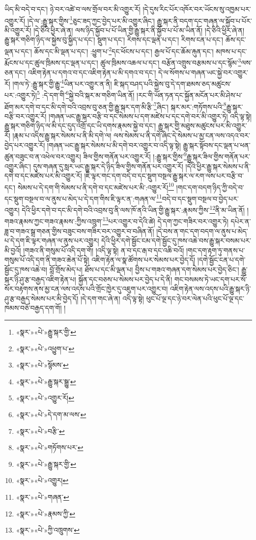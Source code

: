 ཡིད་མི་བདེ་བ་དང་། ཉེ་བར་འཚེ་བ་ལས་གྲོལ་བར་མི་འགྱུར་རོ། །དེ་དུས་རིང་པོར་འཁོར་བར་ཡོངས་སུ་འཁྱམ་པར་འགྱུར་རོ། །དེ་ལ་:རྒྱུ་སྐར་གྱིས་\footnote{«སྣར་»«པེ་»རྒྱུ་སྐར་གྱི་}ཅུང་ཟད་ཀྱང་བྱེད་པར་མི་འགྱུར་ཞིང་། རྒྱུ་སྐར་ནི་བདག་དང་གཞན་ལ་སྐྱོབ་པ་པོར་མི་འགྱུར་རོ། །དེ་ཅིའི་ཕྱིར་ཞེ་ན། ལས་ཉིད་སྐྱོབ་པ་པོ་ཡིན་གྱི་རྒྱུ་སྐར་ནི་སྐྱོབ་པ་པོ་མ་ཡིན་ནོ། །དེ་ཅིའི་ཕྱིར་ཞེ་ན། རྒྱུ་སྐར་གཅིག་ཉིད་ལ་སྐྱེས་བུ་སྐྱིད་པ་དང་། སྡུག་པ་དང་། རིགས་དང་ལྡན་པ་དང་། རིགས་ངན་པ་དང་། ཆོས་དང་ལྡན་པ་དང་། ཆོས་དང་མི་ལྡན་པ་དང་། :ཕྱུག་པ་\footnote{«སྣར་»«པེ་»འཕྱུག་པ་}དང་ཕོངས་པ་དང་། རྒྱལ་པོ་དང་ཆོམ་རྐུན་དང་། མཁས་པ་དང་རྨོངས་པ་དང་ཚུལ་ཁྲིམས་དང་ལྡན་པ་དང་། ཚུལ་ཁྲིམས་འཆལ་པ་དང་། བརྩོན་འགྲུས་བརྩམས་པ་དང་སྙོམ་\footnote{«སྣར་»«པེ་»སྙོམས་}ལས་ཅན་དང་། འཇིག་རྟེན་པ་དགའ་བ་དང་འཇིག་རྟེན་པ་མི་དགའ་བ་དང་། དེ་ལ་སོགས་པ་གཞན་ཡང་སྐྱེ་བར་འགྱུར་རོ། །གལ་ཏེ་:རྒྱུ་སྐར་གྱི་རྒྱུ་\footnote{«སྣར་»«པེ་»རྒྱུ་སྐར་སྒྱུ་}ཡིན་པར་འགྱུར་ན་ནི། ཇི་སྐད་བཤད་པའི་སྐྱེས་བུ་དེ་དག་ཐམས་ཅད་མཚུངས་པར་:འགྱུར་ཏེ།\footnote{«སྣར་»«པེ་»འགྱུར་རོ།} :དེ་དག་གི་\footnote{«སྣར་»«པེ་»དེ་དག་མ་ལས་}སྐྱེ་བའི་སྐར་མ་གཅིག་ཡིན་ནོ། །རང་གི་ཡོན་ཏན་དང་སྐྱོན་མངོན་པར་མི་ཤེས་པ་ཐོག་མར་དགེ་བ་དང་མི་དགེ་བའི་འབྲས་བུ་ཅན་གྱི་རྒྱུ་སྐར་དག་མི་རྩི་\footnote{«སྣར་»«པེ་»བརྩི་}ཞིང་། སྐར་མར་:གཏོགས་པའི་\footnote{«སྣར་»«པེ་»གཏོགས་པར་}རྒྱུ་སྐར་བརྩི་བར་འགྱུར་རོ། །གཞན་ཡང་རྒྱུ་སྐར་བརྩི་བ་དང་སེམས་པ་དག་མཛེས་པ་དང་དགེ་བར་མི་འགྱུར་ཏེ། འདི་ལྟ་སྟེ། རྒྱུ་སྐར་གཅིག་ཉིད་ལ་མི་དང་དུད་འགྲོ་དང་ཡི་དགས་རྣམས་སྐྱེ་བ་དང་། རྒྱུ་སྐར་གྱི་མཐུས་མཚུངས་པར་མི་འགྱུར་རོ། །རྣམ་པ་འདིས་རྒྱུ་སྐར་སེམས་པ་ནི་མི་དགེ་ལ། ལས་སེམས་པ་ནི་དགེ་ཞིང་དེ་སེམས་པ་མྱ་ངན་ལས་འདའ་བར་བྱེད་པར་འགྱུར་རོ། །གཞན་ཡང་རྒྱུ་སྐར་སེམས་པ་མི་དགེ་བར་འགྱུར་བ་འདི་ལྟ་སྟེ། རྒྱུ་སྐར་སྟོབས་དང་ལྡན་པ་ཕན་ཚུན་བཟུང་བ་ན་འཕེལ་བར་འགྱུར། ཟིལ་གྱིས་གནོན་པར་འགྱུར་རོ། །:རྒྱུ་སྐར་གྱིས་\footnote{«སྣར་»«པེ་»རྒྱུ་སྐར་གྱི་}རྒྱུ་སྐར་ཟིལ་གྱིས་གནོན་པར་འགྱུར་ཞིང་། དུས་གཞན་དུ་སླར་ཡང་རྒྱུ་སྐར་དེ་ཉིད་ཟིལ་གྱིས་གནོན་པར་འགྱུར་རོ། །དེའི་ཕྱིར་རྒྱུ་སྐར་སེམས་པ་ནི་དགེ་བ་དང་མཛེས་པར་མི་འགྱུར་རོ། །ཇི་ལྟར་གང་དག་བདེ་བ་དང་སྡུག་བསྔལ་རྒྱུ་སྐར་ལ་རག་ལས་པར་བརྩི་བ་དང་། སེམས་པ་དེ་དག་གི་སེམས་པ་ནི་དགེ་བ་དང་མཛེས་པར་མི་:འགྱུར་རོ།\footnote{«སྣར་»«པེ་»འགྱུར།} །གང་དག་བདག་ཉིད་ཀྱི་བདེ་བ་དང་སྡུག་བསྔལ་བ་ལ་ནུས་པ་མེད་པ་དེ་དག་གིས་ཇི་ལྟར་ན་:གཞན་ལ་\footnote{«སྣར་»«པེ་»གཞན་}བདེ་བ་དང་སྡུག་བསྔལ་བ་བྱེད་པར་འགྱུར། དེའི་ཕྱིར་དགེ་བ་དང་མི་དགེ་བའི་འབྲས་བུ་ནི་ལས་ཁོ་ནའི་ཡིན་གྱི་རྒྱུ་སྐར་:རྣམས་ཀྱིས་\footnote{«སྣར་»«པེ་»རྣམས་ཀྱི་}ནི་མ་ཡིན་ནོ། །གཟའ་རྣམས་ཀྱང་གཟའ་རྣམས་:ཀྱིས་འཁྲུག་\footnote{«སྣར་»«པེ་»ཀྱི་འཁྲུགས་}པར་འགྱུར་བ་དེའི་ཚེ། དེ་དག་ཀྱང་གཟིར་བར་འགྱུར་ཏེ། དཔེར་ན་ཟླ་བ་གཟའ་སྒྲ་གཅན་གྱིས་བཟུང་བས་གཟིར་བར་འགྱུར་བ་བཞིན་ནོ། །དེ་བས་ན་གང་དག་བདག་ལ་ནུས་པ་མེད་པ་དེ་དག་ཇི་ལྟར་གཞན་ལ་ནུས་པར་འགྱུར། དེའི་ཕྱིར་དགེ་སྦྱོང་ངམ་དགེ་སྦྱོང་དུ་ཁས་འཆེ་བས་རྒྱུ་སྐར་བསམ་པར་མི་བྱའོ། །གཟའ་ནི་གསུམ་པོ་འདི་དག་གོ། །འདི་ལྟ་སྟེ། ན་བ་དང་རྒ་བ་དང་འཆི་བའོ། །གང་དག་རྟག་ཏུ་གནས་པ་གསུམ་པོ་འདི་དག་ནི་གཟའ་ཆེན་པོ་སྟེ། འཇིག་རྟེན་ལ་སྣ་ཚོགས་པར་སེམས་པར་བྱེད་དོ། །དགེ་སྦྱོང་ངན་པ་དགེ་སྦྱོང་དུ་ཁས་འཆེ་བ། བློ་གྲོས་མེད་པ། ཐོས་པ་དང་མི་ལྡན་པ། བྱིས་པ་གཟའ་གཞན་དག་སེམས་པར་བྱེད་ཅིང་། རྒྱུ་སྐར་ཉི་ཤུ་རྩ་བརྒྱད་འཇིག་རྟེན་པ། སྐྱོན་དང་བཅས་པ་སེམས་པར་བྱེད་པ་དེ་ནི། གང་བསམས་ཏེ་ཡང་དག་པར་སོ་སོར་བརྟགས་ནས་མྱ་ངན་ལས་འདས་པའི་གྲོང་ཁྱེར་དུ་འཇུག་པར་འགྱུར་བ། འཇིག་རྟེན་ལས་འདས་པའི་རྒྱུ་སྐར་ཉི་ཤུ་རྩ་བརྒྱད་སེམས་པར་མི་བྱེད་དོ། །དེ་དག་གང་ཞེ་ན། འདི་ལྟ་སྟེ། ཕུང་པོ་ལྔ་དང་ཉེ་བར་ལེན་པའི་ཕུང་པོ་ལྔ་དང་ཁམས་བཅོ་བརྒྱད་དག་གོ། །
